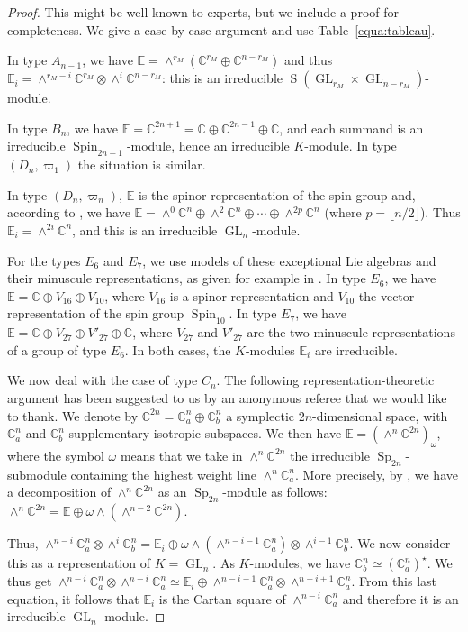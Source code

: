 \documentclass[JEP,XML,SOM,Unicode,NoFloatCountersInSection]{cedram}
\newcommand{\citestar}[3]{\cite[#3]{#1}}
\theoremstyle{plain}
\theoremstyle{definition}
\DeclareMathOperator{\GL}{GL}
\DeclareMathOperator{\rS}{S}
\DeclareMathOperator{\Sp}{Sp}
\DeclareMathOperator{\Spin}{Spin}
\newcommand{\bC}{\mathbb{C}}
\newcommand{\bE}{\mathbb{E}}
\newcommand{\rkm}{{r_M}}
\begin{document}
\begin{proof}
This might be well-known to experts, but we include a proof for completeness.
We give a case by case argument and use Table~\ref{equa:tableau}.

In type $A_{n-1}$, we have $\bE = \wedge^\rkm (\bC^\rkm \oplus \bC^{n-\rkm})$
and thus $\bE_i = \wedge^{\rkm-i} \bC^\rkm \otimes \wedge^i \bC^{n-\rkm}$: this is an irreducible $\rS(\GL_\rkm
\times \GL_{n-\rkm})$-module.

In type $B_n$, we have $\bE = \bC^{2n+1} = \bC \oplus \bC^{2n-1} \oplus \bC$,
and each summand is an irreducible $\Spin_{2n-1}$-module, hence an irreducible $K$-module.
In type $(D_n,\varpi_1)$ the situation is similar.

In type $(D_n,\varpi_n)$, $\bE$ is the spinor
representation of the spin group and, according to \cite{chevalley}, we have $\bE = \wedge^0 \bC^n
\oplus \wedge^2 \bC^n \oplus \cdots \oplus \wedge^{2p} \bC^n$ (where $p=\lfloor n/2\rfloor $). Thus $\bE_i =
\wedge^{2i} \bC^n$, and this is an irreducible $\GL_n$-module.

For the types $E_6$ and $E_7$, we use
models of these exceptional Lie algebras and their minuscule representations, as given for example
in \cite{manivel}. In type $E_6$, we have $\bE = \bC \oplus V_{16} \oplus V_{10}$, where $V_{16}$ is
a spinor representation and $V_{10}$ the vector representation of the spin group $\Spin_{10}$. In
type $E_7$, we have $\bE = \bC \oplus V_{27} \oplus V'_{27} \oplus \bC$, where $V_{27}$ and $V'_{27}$
are the two minuscule representations of a group of type $E_6$. In both cases, the $K$-modules
$\bE_i$ are irreducible.

We now deal with the case of type $C_n$. The following representation-theoretic
argument has been suggested to us by an anonymous referee that we would like to thank.
We denote by $\bC^{2n} = \bC^n_a \oplus \bC^n_b$ a symplectic $2n$-dimensional space, with $\bC^n_a$ and
$\bC^n_b$ supplementary isotropic subspaces. We then have
$\bE=\left (\wedge^n \bC^{2n} \right)_\omega$,
where the symbol $\omega$ means that we take in $\wedge^n \bC^{2n}$ the irreducible
$\Sp_{2n}$-submodule containing the highest weight line $\wedge^n \bC^n_a$.
More precisely, by \citestar{fulton-harris}*{Th.\,17.5}, we have
a decomposition of $\wedge^n \bC^{2n}$ as an $\Sp_{2n}$-module as follows:
$\wedge^n \bC^{2n} = \bE \oplus \omega \wedge (\wedge^{n-2} \bC^{2n})$.

Thus,
$\wedge^{n-i} \bC^n_a \otimes \wedge^i \bC^n_b =
\bE_i \oplus \omega \wedge (\wedge^{n-i-1} \bC^n_a) \otimes \wedge^{i-1} \bC^n_b.$
We now consider this as a representation of $K=\GL_n$. As $K$-modules, we have $\bC^n_b \simeq {(\bC^n_a)}^\star$.
We thus get
$\wedge^{n-i} \bC^n_a \otimes \wedge^{n-i} \bC^n_a \simeq
\bE_i \oplus \wedge^{n-i-1} \bC^n_a \otimes \wedge^{n-i+1} \bC^n_a.$
From this last equation, it follows that $\bE_i$ is the Cartan square of $\wedge^{n-i} \bC^n_a$ and therefore
it is an irreducible $\GL_n$-module.
\end{proof}
\end{document}

